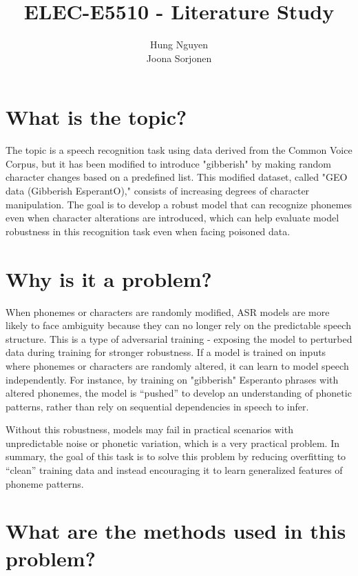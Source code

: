 \documentclass[10pt, english]{article}
\begin{document}
\title{ELEC-E5510 - Literature Study}
\author{
    Hung Nguyen \\
    Joona Sorjonen \\
}
\date{
}

\maketitle

\tableofcontents
\clearpage


\section{What is the topic?}
The topic is a speech recognition task using data derived from the Common Voice Corpus, but it has been modified to introduce "gibberish" by making random character changes based on a predefined list. This modified dataset, called "GEO data (Gibberish EsperantO)," consists of increasing degrees of character manipulation.
The goal is to develop a robust model that can recognize phonemes even when character alterations are introduced, which can help evaluate model robustness in this recognition task even when facing poisoned data.


\section{Why is it a problem?}
When phonemes or characters are randomly modified, ASR models are more likely to face ambiguity because they can no longer rely on the predictable speech structure. This is a type of adversarial training - exposing the model to perturbed data during training for stronger robustness. If a model is trained on inputs where phonemes or characters are randomly altered, it can learn to model speech independently. For instance, by training on "gibberish" Esperanto phrases with altered phonemes, the model is “pushed” to develop an understanding of phonetic patterns, rather than rely on sequential dependencies in speech to infer.

Without this robustness, models may fail in practical scenarios with unpredictable noise or phonetic variation, which is a very practical problem. In summary, the goal of this task is to solve this problem by reducing overfitting to “clean” training data and instead encouraging it to learn generalized features of phoneme patterns.



\section{What are the methods used in this problem?}
\end{document}
